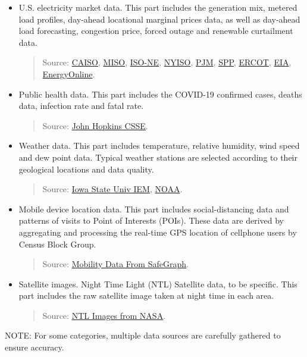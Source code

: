 \documentclass[10pt]{article}
\numberwithin{equation}{section}
\numberwithin{table}{section}
\numberwithin{figure}{section}
\begin{document}
\begin{itemize}
	\item U.S. electricity market data. This part includes the generation mix, metered load profiles, day-ahead locational marginal prices data, as well as day-ahead load forecasting, congestion price, forced outage and renewable curtailment data.
    	\begin{quotation}
    	    Source: \href{http://oasis.caiso.com/mrioasis/logon.do}{CAISO}, \href{https://www.misoenergy.org/markets-and-operations/real-time--market-data/market-reports/}{MISO}, \href{https://www.iso-ne.com/markets-operations/iso-express}{ISO-NE}, \href{https://www.nyiso.com/energy-market-operational-data}{NYISO}, \href{https://dataminer2.pjm.com/list}{PJM}, \href{https://marketplace.spp.org/groups/operational_data}{SPP}, \href{http://www.ercot.com/}{ERCOT}, \href{https://www.eia.gov/beta/electricity/gridmonitor/dashboard/electric_overview/US48/US48}{EIA}, \href{http://www.energyonline.com/}{EnergyOnline}.
    	\end{quotation}
	\item Public health data. This part includes the COVID-19 confirmed cases, deaths data, infection rate and fatal rate.
    	\begin{quotation}
            Source: \href{https://github.com/CSSEGISandData/COVID-19}{John Hopkins CSSE}.
    	\end{quotation}
	\item Weather data. This part includes temperature, relative humidity, wind speed and dew point data. Typical weather stations are selected according to their geological locations and data quality.
        \begin{quotation}
            Source: \href{https://mesonet.agron.iastate.edu/request/download.phtml}{Iowa State Univ IEM}, \href{https://www.nws.noaa.gov/ost/asostech.html}{NOAA}.
        \end{quotation}
	\item Mobile device location data. This part includes social-distancing data and patterns of visits to Point of Interests (POIs). These data are derived by aggregating and processing the real-time GPS location of cellphone users by Census Block Group.
	    \begin{quotation}
	        Source: \href{https://docs.safegraph.com/docs}{Mobility Data From SafeGraph}.
	    \end{quotation}
	\item Satellite images. Night Time Light (NTL)	Satellite data, to be specific. This part includes the raw satellite image taken at night time in each area.
	    \begin{quotation}
	        Source: \href{https://ladsweb.modaps.eosdis.nasa.gov/missions-and-measurements/products/VNP46A1/}{NTL Images from NASA}.
	    \end{quotation}
\end{itemize}
NOTE: For some categories, multiple data sources are carefully gathered to ensure accuracy.
\end{document}

